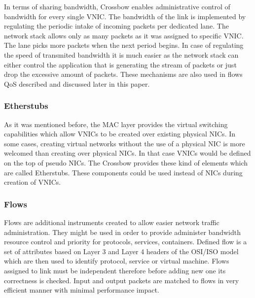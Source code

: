 \documentclass[11pt]{book}
\begin{document}
			In terms of sharing bandwidth, Crossbow enables administrative control of bandwidth for every single VNIC. The bandwidth of the link
			is implemented by regulating the periodic intake of incoming packets per dedicated lane. The network stack allows only as many packets as it was 
			assigned to specific VNIC. The lane picks more packets when the next period begins. In case of regulating the speed of transmited bandwidth it is much
			easier as the network stack can either control the application that is generating the stream of packets or just drop the excessive amount of packets.
			These mechanisms are also used in flows QoS described and discussed later in this paper.

			\subsubsection{Etherstubs}

                        As it was mentioned before, the MAC layer provides the virtual switching capabilities which allow VNICs to be created over existing physical NICs.
                        In some cases, creating virtual networks without the use of a physical NIC is more welcomed than creating over physical NICs. In that case VNICs 
                        would be defined on the top of pseudo NICs. The Crossbow provides these kind of elements which are called Etherstubs. These components could be used
                        instead of NICs during creation of VNICs.

                \subsubsection{Flows}

                        Flows are additional instruments created to allow easier network traffic administration. They might be used in order to provide administer bandwidth resource control and priority for protocols, services, containers.
                        Defined flow is a set of attributes based on Layer 3 and Layer 4 headers of the OSI/ISO model which are then used to identify protocol, service or virtual machine. 
                        Flows assigned to link must be independent therefore before adding new one its correctness is checked. Input and output packets are matched to flows in very efficient 
                        manner with minimal performance impact.

                        \medskip
\end{document}
